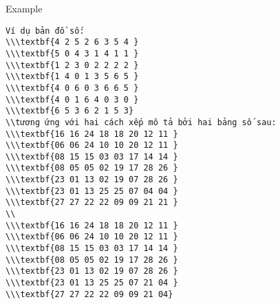Example
\begin{verbatim}
Ví dụ bản đồ số:
\\\textbf{4 2 5 2 6 3 5 4 }
\\\textbf{5 0 4 3 1 4 1 1 }
\\\textbf{1 2 3 0 2 2 2 2 }
\\\textbf{1 4 0 1 3 5 6 5 }
\\\textbf{4 0 6 0 3 6 6 5 }
\\\textbf{4 0 1 6 4 0 3 0 }
\\\textbf{6 5 3 6 2 1 5 3} 
\\tương ứng với hai cách xếp mô tả bởi hai bảng số sau:
\\\textbf{16 16 24 18 18 20 12 11 }
\\\textbf{06 06 24 10 10 20 12 11 }
\\\textbf{08 15 15 03 03 17 14 14 }
\\\textbf{08 05 05 02 19 17 28 26 }
\\\textbf{23 01 13 02 19 07 28 26 }
\\\textbf{23 01 13 25 25 07 04 04 }
\\\textbf{27 27 22 22 09 09 21 21 }
\\
\\\textbf{16 16 24 18 18 20 12 11 }
\\\textbf{06 06 24 10 10 20 12 11 }
\\\textbf{08 15 15 03 03 17 14 14 }
\\\textbf{08 05 05 02 19 17 28 26 }
\\\textbf{23 01 13 02 19 07 28 26 }
\\\textbf{23 01 13 25 25 07 21 04 }
\\\textbf{27 27 22 22 09 09 21 04}\end{verbatim}